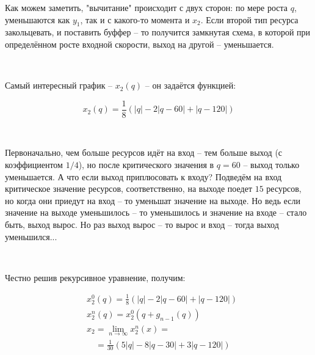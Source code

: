 \vspace{0.5in}

Как можем заметить, "вычитание" происходит с двух сторон: по мере роста $q$, уменьшаются как $y_1$, так и с какого-то момента и $x_2$. Если второй тип ресурса закольцевать, и поставить буффер -- то получится замкнутая схема, в которой при определённом росте входной скорости, выход на другой -- уменьшается.

\

\noindent Самый интересный график -- $x_2(q)$ -- он задаётся функцией:	

$$
x_2(q) = \frac18 \left( |q| - 2|q-60| + |q-120| \right)
$$

\

Первоначально, чем больше ресурсов идёт на вход -- тем больше выход (с коэффициентом $1/4$), но после критического значения в $q=60$ -- выход только уменьшается. А что если выход приплюсовать к входу? Подведём на вход критическое значение ресурсов, соответственно, на выходе поедет $15$ ресурсов, но когда они приедут на вход -- то уменьшат значение на выходе. Но ведь если значение на выходе уменьшилось -- то уменьшилось и значение на входе -- стало быть, выход вырос. Но раз выход вырос -- то вырос и вход -- тогда выход уменьшился...

\

\noindent Честно решив рекурсивное уравнение, получим:

\begin{align*}
	&x^0_2(q) = \frac18 \left( |q| - 2|q-60| + |q-120| \right)\\
	&x^n_2(q) = x^0_2(q + g_{n-1}(q))\\
	&x_2 = \lim_{n\to\infty} x^n_2(x) = \\
	&\quad = \frac1{30} \left( 5|q| - 8|q-30| + 3|q-120| \right)
\end{align*}






\vspace{0.5in}

